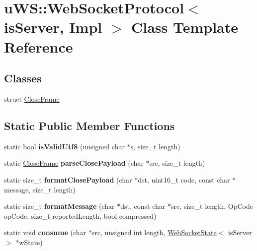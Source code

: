 \hypertarget{classu_w_s_1_1_web_socket_protocol}{}\section{u\+WS\+:\+:Web\+Socket\+Protocol$<$ is\+Server, Impl $>$ Class Template Reference}
\label{classu_w_s_1_1_web_socket_protocol}
\subsection*{Classes}
\begin{DoxyCompactItemize}
\item 
struct \mbox{\hyperlink{structu_w_s_1_1_web_socket_protocol_1_1_close_frame}{Close\+Frame}}
\end{DoxyCompactItemize}
\subsection*{Static Public Member Functions}
\begin{DoxyCompactItemize}
\item 
\mbox{\label{classu_w_s_1_1_web_socket_protocol_abf8aa08ec0de37968aaf2f3eb330f110}} 
static bool {\bfseries is\+Valid\+Utf8} (unsigned char $\ast$s, size\+\_\+t length)
\item 
\mbox{\label{classu_w_s_1_1_web_socket_protocol_a46b8ca9b46dae8d7a412ebe555cff5ea}} 
static \mbox{\hyperlink{structu_w_s_1_1_web_socket_protocol_1_1_close_frame}{Close\+Frame}} {\bfseries parse\+Close\+Payload} (char $\ast$src, size\+\_\+t length)
\item 
\mbox{\label{classu_w_s_1_1_web_socket_protocol_aa1cf9f0be083546c8e127c47d9f2b01c}} 
static size\+\_\+t {\bfseries format\+Close\+Payload} (char $\ast$dst, uint16\+\_\+t code, const char $\ast$message, size\+\_\+t length)
\item 
\mbox{\label{classu_w_s_1_1_web_socket_protocol_af72deddb4854c043e9a1441b5de317b9}} 
static size\+\_\+t {\bfseries format\+Message} (char $\ast$dst, const char $\ast$src, size\+\_\+t length, Op\+Code op\+Code, size\+\_\+t reported\+Length, bool compressed)
\item 
\mbox{\label{classu_w_s_1_1_web_socket_protocol_a5efcc4356e0f4c87daab552c4f6b137c}} 
static void {\bfseries consume} (char $\ast$src, unsigned int length, \mbox{\hyperlink{structu_w_s_1_1_web_socket_state}{Web\+Socket\+State}}$<$ is\+Server $>$ $\ast$w\+State)
\end{DoxyCompactItemize}
